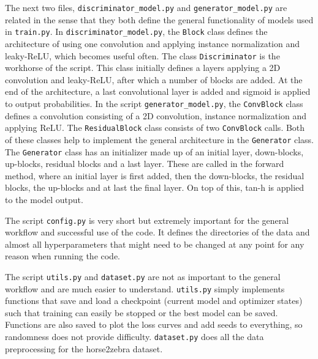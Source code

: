 \documentclass[12pt, fleqn, titlepage]{article}
\newcommand{\1}[1]{\mathds{1}\left[#1\right]}
\begin{document}
The next two files, \texttt{discriminator\_model.py} and \texttt{generator\_model.py} are related in the sense that they both define the general functionality of models used in \texttt{train.py}. In \texttt{discriminator\_model.py}, the \texttt{Block} class defines the architecture of using one convolution and applying instance normalization and leaky-ReLU, which becomes useful often. The class \texttt{Discriminator} is the workhorse of the script. This class initially defines a layers applying a 2D convolution and leaky-ReLU, after which a number of blocks are added. At the end of the architecture, a last convolutional layer is added and sigmoid is applied to output probabilities. In the script \texttt{generator\_model.py}, the \texttt{ConvBlock} class defines a convolution consisting of a 2D convolution, instance normalization and applying ReLU. The \texttt{ResidualBlock} class consists of two \texttt{ConvBlock} calls. Both of these classes help to implement the general architecture in the \texttt{Generator} class. The \texttt{Generator} class has an initializer made up of an initial layer, down-blocks, up-blocks, residual blocks and a last layer. These are called in the forward method, where an initial layer is first added, then the down-blocks, the residual blocks, the up-blocks and at last the final layer. On top of this, tan-h is applied to the model output.

The script \texttt{config.py} is very short but extremely important for the general workflow and successful use of the code. It defines the directories of the data and almost all hyperparameters that might need to be changed at any point for any reason when running the code.

The script \texttt{utils.py} and \texttt{dataset.py} are not as important to the general workflow and are much easier to understand. \texttt{utils.py} simply implements functions that save and load a checkpoint (current model and optimizer states) such that training can easily be stopped or the best model can be saved. Functions are also saved to plot the loss curves and add seeds to everything, so randomness does not provide difficulty. \texttt{dataset.py} does all the data preprocessing for the horse2zebra dataset.
\end{document}
